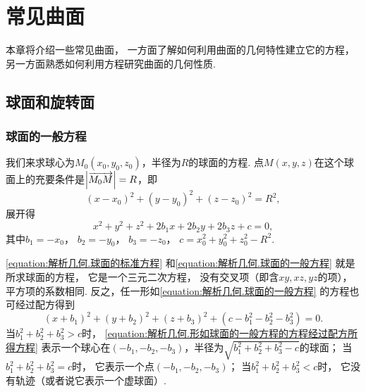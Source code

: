 \section{常见曲面}
本章将介绍一些常见曲面，
一方面了解如何利用曲面的几何特性建立它的方程，
另一方面熟悉如何利用方程研究曲面的几何性质.

\subsection{球面和旋转面}
\subsubsection{球面的一般方程}
我们来求球心为\(M_0(x_0,y_0,z_0)\)，半径为\(R\)的球面的方程.
点\(M(x,y,z)\)在这个球面上的充要条件是\(\abs{\overrightarrow{M_0 M}} = R\)，即
\begin{equation}\label{equation:解析几何.球面的标准方程}
	(x-x_0)^2+(y-y_0)^2+(z-z_0)^2=R^2,
\end{equation}
展开得
\begin{equation}\label{equation:解析几何.球面的一般方程}
	x^2 + y^2 + z^2 + 2 b_1 x + 2 b_2 y + 2 b_3 z + c = 0,
\end{equation}
其中\(b_1 = -x_0\)，
\(b_2 = -y_0\)，
\(b_3 = -z_0\)，
\(c = x_0^2 + y_0^2 + z_0^2 - R^2\).

\cref{equation:解析几何.球面的标准方程}
和\cref{equation:解析几何.球面的一般方程}
就是所求球面的方程，
它是一个三元二次方程，
没有交叉项（即含\(xy,xz,yz\)的项），
平方项的系数相同.
反之，任一形如\cref{equation:解析几何.球面的一般方程} 的方程也可经过配方得到
\begin{equation}\label{equation:解析几何.形如球面的一般方程的方程经过配方所得方程}
	(x+b_1)^2 + (y+b_2)^2 + (z+b_3)^2 + (c-b_1^2-b_2^2-b_3^2) = 0.
\end{equation}
当\(b_1^2+b_2^2+b_3^2>c\)时，
\cref{equation:解析几何.形如球面的一般方程的方程经过配方所得方程}
表示一个球心在\((-b_1,-b_2,-b_3)\)，半径为\(\sqrt{b_1^2+b_2^2+b_3^2-c}\)的球面；
当\(b_1^2+b_2^2+b_3^2=c\)时，
它表示一个点\((-b_1,-b_2,-b_3)\)；
当\(b_1^2+b_2^2+b_3^2<c\)时，
它没有轨迹（或者说它表示一个虚球面）.


